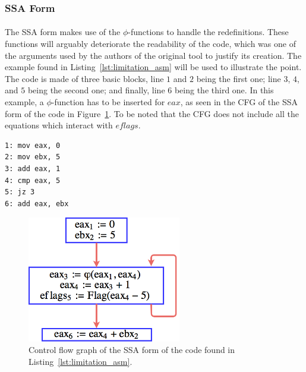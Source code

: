 \subsubsection{SSA Form}
\paragraph{}
The SSA form makes use of the $\phi$-functions to handle the redefinitions. These functions will arguably deteriorate the readability of the code, which was one of the arguments used by the authors of the original tool to justify its creation. The example found in Listing~\ref{lst:limitation_asm} will be used to illustrate the point. The code is made of three basic blocks, line $1$ and $2$ being the first one; line $3$, $4$, and $5$ being the second one; and finally, line $6$ being the third one. In this example, a $\phi$-function has to be inserted for $eax$, as seen in the CFG of the SSA form of the code in Figure~\ref{fig:limitation_cfg}. To be noted that the CFG does not include all the equations which interact with $eflags$.\\

\pagebreak

\begin{lstlisting}[caption={Simple assembly code.}, label={lst:limitation_asm}, frame=tlrb, language={[x86masm]Assembler}]
1: mov eax, 0
2: mov ebx, 5
3: add eax, 1
4: cmp eax, 5
5: jz 3
6: add eax, ebx
\end{lstlisting}

\begin{figure}[!htb]
	\centering
	\includegraphics[width=0.6\textwidth]{contribution/limitation_cfg.png}
	\caption{Control flow graph of the SSA form of the code found in Listing~\ref{lst:limitation_asm}.}
	\label{fig:limitation_cfg}
\end{figure}

